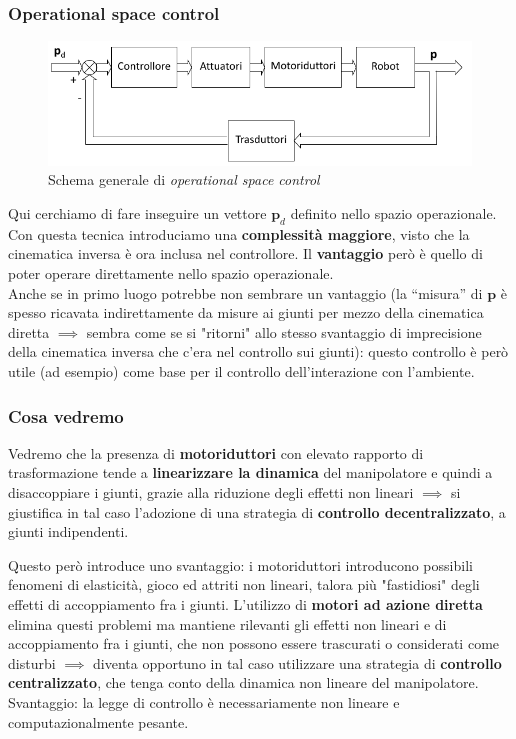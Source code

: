 \subsubsection{Operational space control}
\begin{figure}[ht!]
	\centering
	\includegraphics[width=0.7\linewidth]{images/operational_control_1}
	\caption{Schema generale di \textit{operational space control}}
	\label{fig:operationalcontrol1}
\end{figure}

Qui cerchiamo di fare inseguire un vettore $\mathbf{p}_d$ definito nello spazio operazionale. Con questa tecnica introduciamo una \textbf{complessità maggiore}, visto che la cinematica inversa è ora inclusa nel controllore. Il \textbf{vantaggio} però è quello di poter operare direttamente nello spazio operazionale.\\
Anche se in primo luogo potrebbe non sembrare un vantaggio (la “misura” di $\mathbf{p}$ è spesso ricavata indirettamente da misure ai giunti per mezzo della cinematica diretta $\implies$ sembra come se si "ritorni" allo stesso svantaggio di imprecisione della cinematica inversa che c'era nel controllo sui giunti): questo controllo è però utile (ad esempio) come base per il controllo dell’interazione con l’ambiente.\\

\subsubsection{Cosa vedremo}
Vedremo che la presenza di \textbf{motoriduttori} con elevato rapporto di trasformazione tende a \textbf{linearizzare la dinamica} del manipolatore e quindi a disaccoppiare i giunti, grazie alla riduzione degli effetti non lineari $\implies$ si giustifica in tal caso l’adozione di una strategia di \textbf{controllo decentralizzato}, a giunti indipendenti. 

Questo però introduce uno svantaggio: i motoriduttori introducono possibili fenomeni di elasticità, gioco ed attriti non lineari, talora più "fastidiosi" degli effetti di accoppiamento fra i giunti. L’utilizzo di \textbf{motori ad azione diretta} elimina questi problemi ma mantiene rilevanti gli effetti non lineari e di accoppiamento fra i giunti, che non possono essere trascurati o considerati come disturbi $\implies$ diventa opportuno in tal caso utilizzare una strategia di \textbf{controllo centralizzato}, che tenga conto della dinamica non lineare del manipolatore. Svantaggio: la legge di controllo è necessariamente non lineare e computazionalmente pesante.





